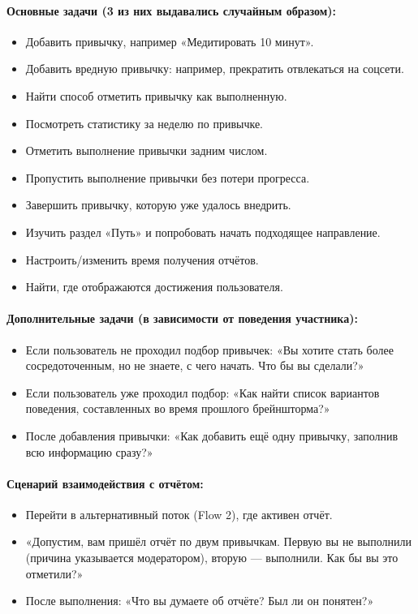 \documentclass[pdflatex,sn-mathphys-num]{sn-jnl}%
\theoremstyle{thmstyleone}%
\theoremstyle{thmstyletwo}%
\theoremstyle{thmstylethree}%
\begin{document}
\paragraph{Основные задачи (3 из них выдавались случайным образом):}
\begin{itemize}
\item Добавить привычку, например «Медитировать 10 минут».
\item Добавить вредную привычку: например, прекратить отвлекаться на соцсети.
\item Найти способ отметить привычку как выполненную.
\item Посмотреть статистику за неделю по привычке.
\item Отметить выполнение привычки задним числом.
\item Пропустить выполнение привычки без потери прогресса.
\item Завершить привычку, которую уже удалось внедрить.
\item Изучить раздел «Путь» и попробовать начать подходящее направление.
\item Настроить/изменить время получения отчётов.
\item Найти, где отображаются достижения пользователя.
\end{itemize}

\paragraph{Дополнительные задачи (в зависимости от поведения участника):}
\begin{itemize}
\item Если пользователь не проходил подбор привычек: «Вы хотите стать более сосредоточенным, но не знаете, с чего начать. Что бы вы сделали?»
\item Если пользователь уже проходил подбор: «Как найти список вариантов поведения, составленных во время прошлого брейншторма?»
\item После добавления привычки: «Как добавить ещё одну привычку, заполнив всю информацию сразу?»
\end{itemize}

\paragraph{Сценарий взаимодействия с отчётом:}
\begin{itemize}
\item Перейти в альтернативный поток (Flow 2), где активен отчёт.
\item «Допустим, вам пришёл отчёт по двум привычкам. Первую вы не выполнили (причина указывается модератором), вторую — выполнили. Как бы вы это отметили?»
\item После выполнения: «Что вы думаете об отчёте? Был ли он понятен?»
\end{itemize}
\end{document}
